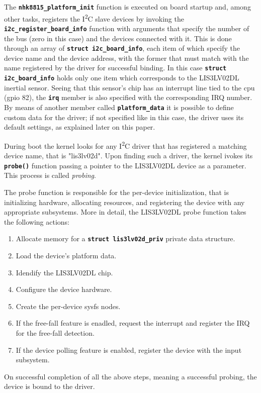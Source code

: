 \documentclass[a4paper,10pt]{article}
\newenvironment{packedenum}{
\begin{enumerate}
  \setlength{\itemsep}{3pt}
  \setlength{\parskip}{0pt}
  \setlength{\parsep}{0pt}
}{\end{enumerate}}
\newcommand{\icc}{I\textsuperscript{2}C }
\newcommand{\keyword}[1]{\texttt{\textbf{#1}}}
\begin{document}
\begin{multicols}{2}
The \keyword{nhk8815\_platform\_init} function is executed on board startup
and, among other tasks, registers the \icc slave devices by invoking the
\keyword{i2c\_register\_board\_info} function with arguments that specify
the number of the bus (zero in this case) and the devices connected with it.
This is done through an array of \keyword{struct i2c\_board\_info}, each item
of which specify the device name and the device address, with the former that
must match with the name registered by the driver for successful binding.
In this case \keyword{struct i2c\_board\_info} holds only one item which
corresponds to the LIS3LV02DL inertial sensor. Seeing that this sensor's chip
has an interrupt line tied to the cpu (gpio 82), the \keyword{irq} member is
also specified with the corresponding IRQ number. By means of another member
called \keyword{platform\_data} it is possible to define custom data for the
driver; if not specified like in this case, the driver uses its default
settings, as explained later on this paper.

During boot the kernel looks for any \icc driver that has registered a matching
device name, that is "lis3lv02d". Upon finding such a driver, the kernel
ivokes its \keyword{probe()} function passing a pointer to the LIS3LV02DL
device as a parameter. This process is called \emph{probing}.

The probe function is responsible for the per-device initialization, that is
initializing hardware, allocating resources, and registering the device with
any appropriate subsystems. More in detail, the LIS3LV02DL probe function
takes the following actions:
\begin{packedenum}
	\item Allocate memory for a \keyword{struct lis3lv02d\_priv} private data
		structure.
	\item Load the device's platform data.
	\item Idendify the LIS3LV02DL chip.
	\item Configure the device hardware.
	\item Create the per-device sysfs nodes.
	\item If the free-fall feature is enadled, request the interrupt and
		register the IRQ for the free-fall detection.
	\item If the device polling feature is enabled, register the device with
		the input subsystem.
\end{packedenum}
On successful completion of all the above steps, meaning a successful probing,
the device is bound to the driver.



\end{multicols}
\end{document}
